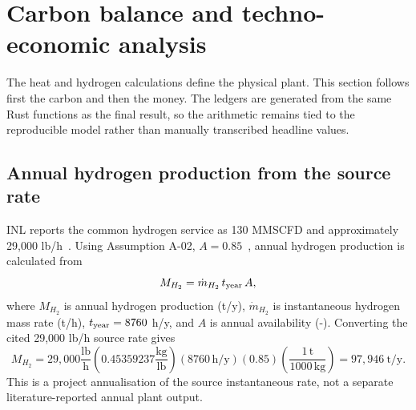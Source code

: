 \section{Carbon balance and techno-economic analysis}
\label{sec:ledgers}
The heat and hydrogen calculations define the physical plant. This section follows first the carbon and then the money. The ledgers are generated from the same Rust functions as the final result, so the arithmetic remains tied to the reproducible model rather than manually transcribed headline values.

\subsection{Annual hydrogen production from the source rate}
INL reports the common hydrogen service as 130 MMSCFD and approximately 29,000 lb/h~\cite{inltev953,inltev961}. Using Assumption A-02, $A=0.85$~\cite{nishihara2007potential}, annual hydrogen production is calculated from
\begin{equation}\label{eq:annual-h2-general}
M_{H_2}=\dot m_{H_2}\,t_{\rm year}\,A,
\end{equation}
where $M_{H_2}$ is annual hydrogen production (t/y), $\dot m_{H_2}$ is instantaneous hydrogen mass rate (t/h), $t_{\rm year}=8760$ h/y, and $A$ is annual availability (-). Converting the cited 29,000 lb/h source rate gives
\begin{equation}\label{eq:annual-h2}
M_{H_2}=29{,}000\frac{\mathrm{lb}}{\mathrm h}
\left(0.45359237\frac{\mathrm{kg}}{\mathrm{lb}}\right)
(8760\,\mathrm{h/y})(0.85)
\left(\frac{1\,\mathrm t}{1000\,\mathrm{kg}}\right)
=97{,}946~\mathrm{t/y}.
\end{equation}
This is a project annualisation of the source instantaneous rate, not a separate literature-reported annual plant output.

